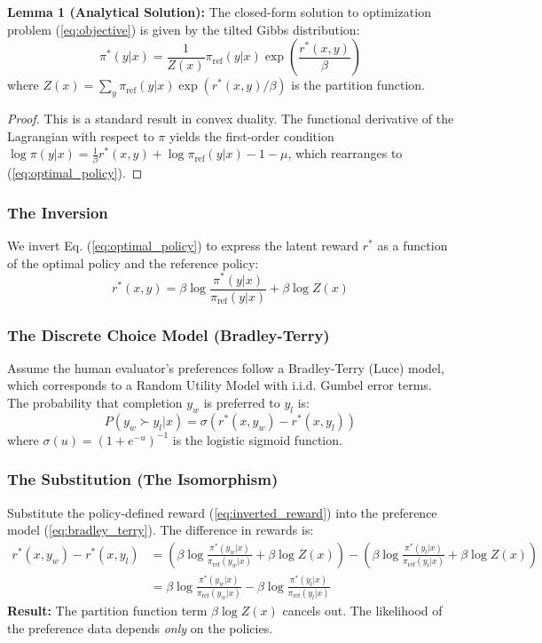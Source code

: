 \textbf{Lemma 1 (Analytical Solution):} The closed-form solution to optimization problem (\ref{eq:objective}) is given by the tilted Gibbs distribution:
\begin{equation}
    \pi^*(y|x) = \frac{1}{Z(x)} \pi_{\text{ref}}(y|x) \exp\left( \frac{r^*(x, y)}{\beta} \right)
    \label{eq:optimal_policy}
\end{equation}
where $Z(x) = \sum_y \pi_{\text{ref}}(y|x) \exp(r^*(x, y)/\beta)$ is the partition function.

\begin{proof}
    This is a standard result in convex duality. The functional derivative of the Lagrangian with respect to $\pi$ yields the first-order condition $\log \pi(y|x) = \frac{1}{\beta} r^*(x,y) + \log \pi_{\text{ref}}(y|x) - 1 - \mu$, which rearranges to (\ref{eq:optimal_policy}).
\end{proof}

\subsubsection{The Inversion}
We invert Eq. (\ref{eq:optimal_policy}) to express the latent reward $r^*$ as a function of the optimal policy and the reference policy:
\begin{equation}
    r^*(x, y) = \beta \log \frac{\pi^*(y|x)}{\pi_{\text{ref}}(y|x)} + \beta \log Z(x)
    \label{eq:inverted_reward}
\end{equation}

\subsubsection{The Discrete Choice Model (Bradley-Terry)}
Assume the human evaluator's preferences follow a Bradley-Terry (Luce) model, which corresponds to a Random Utility Model with i.i.d. Gumbel error terms. The probability that completion $y_w$ is preferred to $y_l$ is:
\begin{equation}
    P(y_w \succ y_l | x) = \sigma(r^*(x, y_w) - r^*(x, y_l))
    \label{eq:bradley_terry}
\end{equation}
where $\sigma(u) = (1 + e^{-u})^{-1}$ is the logistic sigmoid function.

\subsubsection{The Substitution (The Isomorphism)}
Substitute the policy-defined reward (\ref{eq:inverted_reward}) into the preference model (\ref{eq:bradley_terry}). The difference in rewards is:
\begin{align*}
    r^*(x, y_w) - r^*(x, y_l) &= \left( \beta \log \frac{\pi^*(y_w|x)}{\pi_{\text{ref}}(y_w|x)} + \beta \log Z(x) \right) - \left( \beta \log \frac{\pi^*(y_l|x)}{\pi_{\text{ref}}(y_l|x)} + \beta \log Z(x) \right) \\
    &= \beta \log \frac{\pi^*(y_w|x)}{\pi_{\text{ref}}(y_w|x)} - \beta \log \frac{\pi^*(y_l|x)}{\pi_{\text{ref}}(y_l|x)}
\end{align*}
\textbf{Result:} The partition function term $\beta \log Z(x)$ cancels out. The likelihood of the preference data depends \textit{only} on the policies.

